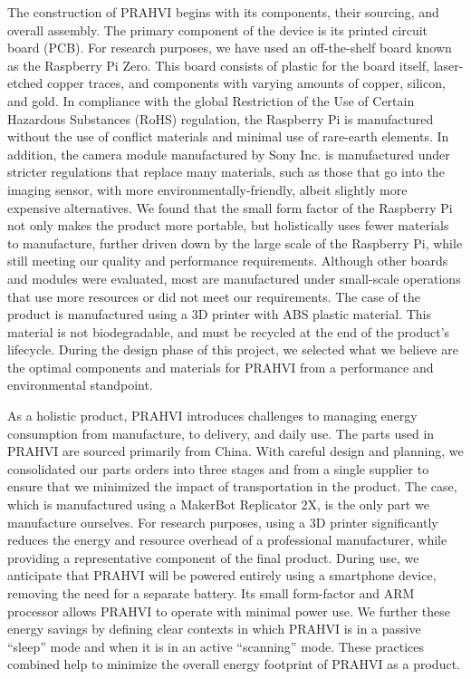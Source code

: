 	The construction of PRAHVI begins with its components, their sourcing, and overall assembly. The primary component of the device is its printed circuit board (PCB). For research purposes, we have used an off-the-shelf board known as the Raspberry Pi Zero. This board consists of plastic for the board itself, laser-etched copper traces, and components with varying amounts of copper, silicon, and gold. In compliance with the global Restriction of the Use of Certain Hazardous Substances (RoHS) regulation, the Raspberry Pi is manufactured without the use of conflict materials and minimal use of rare-earth elements. In addition, the camera module manufactured by Sony Inc. is manufactured under stricter regulations that replace many materials, such as those that go into the imaging sensor, with more environmentally-friendly, albeit slightly more expensive alternatives. We found that the small form factor of the Raspberry Pi not only makes the product more portable, but holistically uses fewer materials to manufacture, further driven down by the large scale of the Raspberry Pi, while still meeting our quality and performance requirements. Although other boards and modules were evaluated, most are manufactured under small-scale operations that use more resources or did not meet our requirements. The case of the product is manufactured using a 3D printer with ABS plastic material. This material is not biodegradable, and must be recycled at the end of the product’s lifecycle. During the design phase of this project, we selected what we believe are the optimal components and materials for PRAHVI from a performance and environmental standpoint.
	
	As a holistic product, PRAHVI introduces challenges to managing energy consumption from manufacture, to delivery, and daily use. The parts used in PRAHVI are sourced primarily from China. With careful design and planning, we consolidated our parts orders into three stages and from a single supplier to ensure that we minimized the impact of transportation in the product. The case, which is manufactured using a MakerBot Replicator 2X, is the only part we manufacture ourselves. For research purposes, using a 3D printer significantly reduces the energy and resource overhead of a professional manufacturer, while providing a representative component of the final product. During use, we anticipate that PRAHVI will be powered entirely using a smartphone device, removing the need for a separate battery. Its small form-factor and ARM processor allows PRAHVI to operate with minimal power use. We further these energy savings by defining clear contexts in which PRAHVI is in a passive “sleep” mode and when it is in an active “scanning” mode. These practices combined help to minimize the overall energy footprint of PRAHVI as a product.
	
